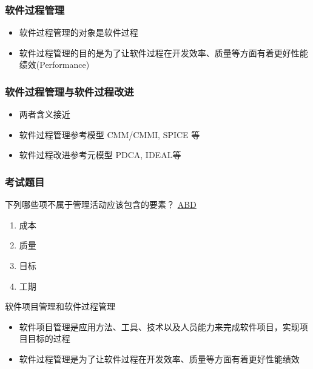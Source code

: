 \subsubsection{软件过程管理}
\begin{itemize}
    \item 软件过程管理的对象是软件过程
    \item 软件过程管理的目的是为了让软件过程在开发效率、质量等方面有着更好性能绩效(Performance)
\end{itemize}

\subsubsection{软件过程管理与软件过程改进}
\vspace{-0.8em}
\begin{multicols}{2}
    \begin{itemize}
        \item 两者含义接近
        \item 软件过程管理参考模型 CMM/CMMI, SPICE 等
        \item 软件过程改进参考元模型 PDCA, IDEAL等
    \end{itemize}
\end{multicols}
\vspace{-1em}


\subsubsection{考试题目}
\begin{problem}
    下列哪些项不属于管理活动应该包含的要素？
	\uline{ABD}    
    \vspace{-0.8em}
    \begin{multicols}{4}
        \begin{enumerate}[label=\Alph*.]
            \item 成本
            \item 质量
            \item 目标
            \item 工期
        \end{enumerate}
    \end{multicols}
    \vspace{-1em}
\end{problem}

\begin{problem}
软件项目管理和软件过程管理
\begin{itemize}
    \item 软件项目管理是应用方法、工具、技术以及人员能力来完成软件项目，实现项目目标的过程
    \item 软件过程管理是为了让软件过程在开发效率、质量等方面有着更好性能绩效
\end{itemize}
\end{problem}


